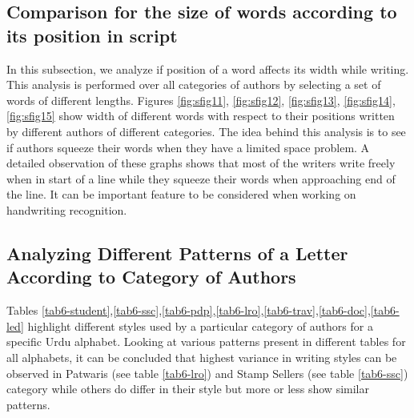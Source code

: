 \documentclass[a4paper,conference]{IEEEtran}
\begin{document}
      
      
      


 




\subsection{Comparison for the size of words according to its position in script}

In this subsection, we analyze if position of a word affects its width while writing. This analysis is performed over all categories of authors by selecting a set of words of different lengths. Figures \ref{fig:sfig11}, \ref{fig:sfig12}, \ref{fig:sfig13}, \ref{fig:sfig14}, \ref{fig:sfig15} show width of different words with respect to their positions written by different authors of different categories. The idea behind this analysis is to see if authors squeeze their words when they have a limited space problem. A detailed observation of these graphs shows that most of the writers write freely when in start of a line while they squeeze their words when approaching end of the line. It can be important feature to be considered when working on handwriting recognition. 







\subsection{Analyzing Different Patterns of a Letter According to Category of Authors}

Tables \ref{tab6-student},\ref{tab6-ssc},\ref{tab6-pdp},\ref{tab6-lro},\ref{tab6-trav},\ref{tab6-doc},\ref{tab6-led} highlight different styles used by a particular category of authors for a specific Urdu alphabet. Looking at various patterns present in different tables for all alphabets, it can be concluded that highest variance in writing styles can be observed in Patwaris (see table \ref{tab6-lro}) and Stamp Sellers (see table \ref{tab6-ssc}) category while others do differ in their style but more or less show similar patterns. 
\end{document}
